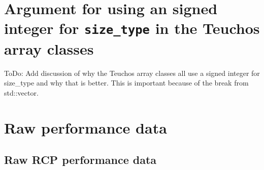 \documentclass[pdf,ps2pdf,11pt]{SANDreport}
\begin{document}
%
{}\section{Argument for using an signed integer for
{}\texttt{size\_type} in the Teuchos array classes}
\label{sec:unsigned_size_type}
%

ToDo: Add discussion of why the Teuchos array classes all use a signed
integer for size\_type and why that is better.  This is important
because of the break from std::vector.


%
{}\section{Raw performance data}
\label{apdx:raw-perf-data}
%

%
{}\subsection{Raw RCP performance data}
\label{apdx:raw-rcp-perf-data}
%
\end{document}
